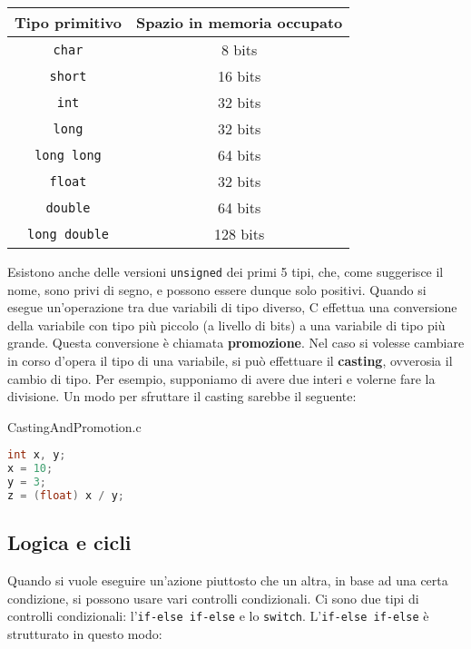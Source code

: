 \begin{center}
    \begin{tabular}{|c|c|}
        \hline
        \textbf{Tipo primitivo} & \textbf{Spazio in memoria occupato} \\
        \hline
        \verb|char| & 8 bits \\
        \verb|short| & 16 bits \\
        \verb|int| & 32 bits \\
        \verb|long| & 32 bits \\
        \verb|long long| & 64 bits \\
        \verb|float| & 32 bits \\
        \verb|double| & 64 bits \\
        \verb|long double| & 128 bits \\
        \hline
    \end{tabular}
\end{center}

Esistono anche delle versioni \verb|unsigned| dei primi 5 tipi, che, come suggerisce il nome, sono privi di segno, e possono essere dunque solo positivi.
\nl
Quando si esegue un'operazione tra due variabili di tipo diverso, C effettua una conversione della variabile con tipo più piccolo (a livello di bits) a una variabile di tipo più grande. Questa conversione è chiamata \textbf{promozione}.
\nl
Nel caso si volesse cambiare in corso d'opera il tipo di una variabile, si può effettuare il \textbf{casting}, ovverosia il cambio di tipo. Per esempio, supponiamo di avere due interi e volerne fare la divisione. Un modo per sfruttare il casting sarebbe il seguente:

\begin{codeblock}{CastingAndPromotion.c}
    \begin{lstlisting}[language = c]
int x, y;
x = 10;
y = 3;
z = (float) x / y;\end{lstlisting}
\end{codeblock}

\subsection{Logica e cicli}

Quando si vuole eseguire un'azione piuttosto che un altra, in base ad una certa condizione, si possono usare vari controlli condizionali. Ci sono due tipi di controlli condizionali: l'\verb|if-else if-else| e lo \verb|switch|. L'\verb|if-else if-else| è strutturato in questo modo:

